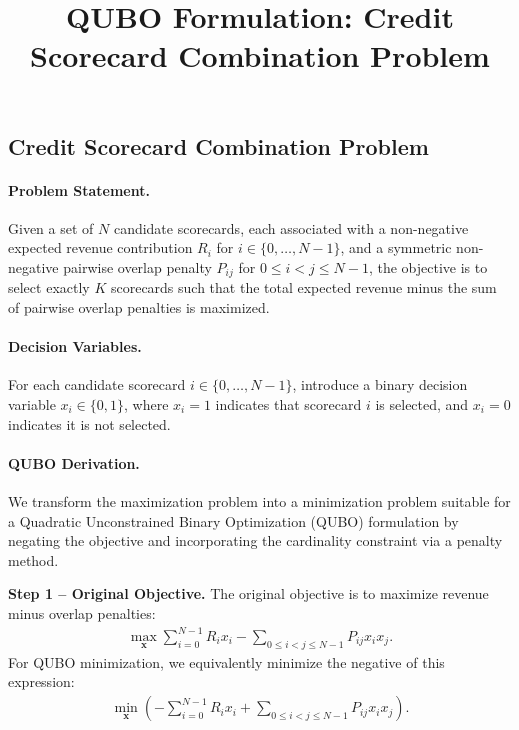 \documentclass[12pt]{article}
\title{QUBO Formulation: Credit Scorecard Combination Problem}
\date{}
\begin{document}
\maketitle

\subsection*{Credit Scorecard Combination Problem}

\paragraph{Problem Statement.}
Given a set of $N$ candidate scorecards, each associated with a non-negative expected revenue contribution $R_i$ for $i \in \{0, \dots, N-1\}$, and a symmetric non-negative pairwise overlap penalty $P_{ij}$ for $0 \leq i < j \leq N-1$, the objective is to select exactly $K$ scorecards such that the total expected revenue minus the sum of pairwise overlap penalties is maximized.

\paragraph{Decision Variables.}
For each candidate scorecard $i \in \{0, \dots, N-1\}$, introduce a binary decision variable $x_i \in \{0, 1\}$, where $x_i = 1$ indicates that scorecard $i$ is selected, and $x_i = 0$ indicates it is not selected.

\paragraph{QUBO Derivation.}
We transform the maximization problem into a minimization problem suitable for a Quadratic Unconstrained Binary Optimization (QUBO) formulation by negating the objective and incorporating the cardinality constraint via a penalty method.

\textbf{Step 1 -- Original Objective.} The original objective is to maximize revenue minus overlap penalties:
\begin{align}
    \max_{\mathbf{x}} \sum_{i=0}^{N-1} R_i x_i - \sum_{0 \leq i < j \leq N-1} P_{ij} x_i x_j.
\end{align}
For QUBO minimization, we equivalently minimize the negative of this expression:
\begin{align}
    \min_{\mathbf{x}} \left( -\sum_{i=0}^{N-1} R_i x_i + \sum_{0 \leq i < j \leq N-1} P_{ij} x_i x_j \right).
\end{align}
\end{document}
